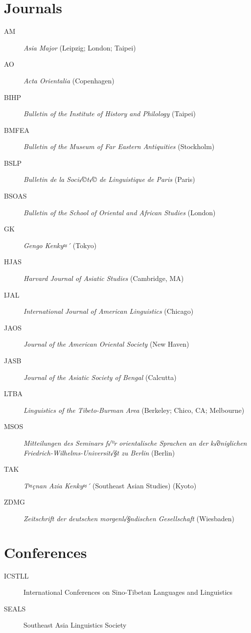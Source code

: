 \section*{Journals}
\begin{multicols}{2}
\begin{description}
\item[AM]	\textit{Asia Major} (Leipzig; London; Taipei)
\item[AO]	\textit{Acta Orientalia} (Copenhagen)
\item[BIHP]	\textit{Bulletin of the Institute of History and Philology} (Taipei)
\item[BMFEA]	\textit{Bulletin of the Museum of Far Eastern Antiquities} (Stockholm)
\item[BSLP]	\textit{Bulletin de la Soci√©t√© de Linguistique de Paris} (Paris)
\item[BSOAS]	\textit{Bulletin of the School of Oriental and African Studies} (London)
\item[GK]	\textit{Gengo Kenky≈´} (Tokyo)
\end{description}
\end{multicols}

\pagebreak

\begin{multicols}{2}
\begin{description}
\item[HJAS]	\textit{Harvard Journal of Asiatic Studies} (Cambridge, MA)
\item[IJAL]	\textit{International Journal of American Linguistics} (Chicago)
\item[JAOS]	\textit{Journal of the American Oriental Society} (New Haven)
\item[JASB]	\textit{Journal of the Asiatic Society of Bengal} (Calcutta)
\item[LTBA]	\textit{Linguistics of the Tibeto-Burman Area} (Berkeley; Chico, CA; Melbourne)
\columnbreak
\item[MSOS]	\textit{Mitteilungen des Seminars f√ºr orientalische Sprachen an der k√∂niglichen Friedrich-Wilhelms-Universit√§t zu Berlin} (Berlin)
\item[TAK]	\textit{T≈çnan Azia Kenky≈´} (Southeast Asian Studies) (Kyoto)
\item[ZDMG]	\textit{Zeitschrift der deutschen morgenl√§ndischen Gesellschaft} (Wiesbaden)
\end{description}
\end{multicols}

\section*{Conferences}
\begin{multicols}{2}
\begin{description}
\item[ICSTLL]	International Conferences on Sino-Tibetan Languages and Linguistics
\item[SEALS]	Southeast Asia Linguistics Society
\end{description}
\end{multicols}

